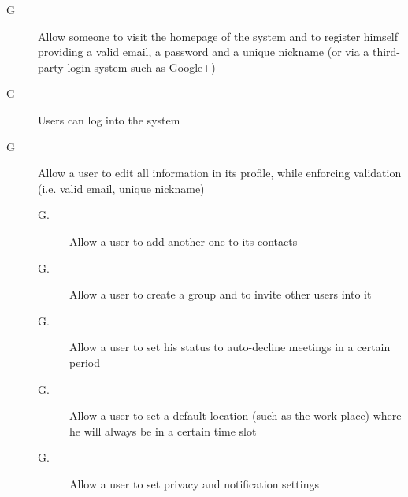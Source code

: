 
\begin{description}
\item[G\thecount\label{itm:G1}] Allow someone to visit the homepage of the system and to register himself providing a valid email, a password and a unique nickname (or via a third-party login system such as Google+)

\setcounter{countin}{1}

\item[G\thecount] Users can log into the system

\setcounter{countin}{1}

\item[G\thecount] Allow a user to edit all information in its profile, while enforcing validation (i.e. valid email, unique nickname)
\begin{description}
\item[G\thecount.\thecountin] Allow a user to add another one to its contacts
\item[G\thecount.\thecountin] Allow a user to create a group and to invite other users into it
\item[G\thecount.\thecountin] Allow a user to set his status to auto-decline meetings in a certain period
\item[G\thecount.\thecountin] Allow a user to set a default location (such as the work place) where he will always be in a certain time slot
\item[G\thecount.\thecountin] Allow a user to set privacy and notification settings
\end{description}

\setcounter{countin}{1}


\end{description}
